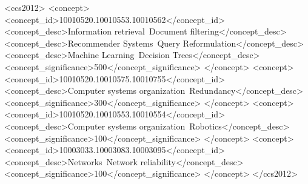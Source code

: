 \documentclass{sig-alternate-05-2015}
\begin{document}
%
%
\begin{CCSXML}
<ccs2012>
 <concept>
  <concept_id>10010520.10010553.10010562</concept_id>
  <concept_desc>Information retrieval~Document filtering</concept_desc>
  <concept_desc>Recommender Systems~Query Reformulation</concept_desc>
  <concept_desc>Machine Learning~Decision Trees</concept_desc>
  <concept_significance>500</concept_significance>
 </concept>
 <concept>
  <concept_id>10010520.10010575.10010755</concept_id>
  <concept_desc>Computer systems organization~Redundancy</concept_desc>
  <concept_significance>300</concept_significance>
 </concept>
 <concept>
  <concept_id>10010520.10010553.10010554</concept_id>
  <concept_desc>Computer systems organization~Robotics</concept_desc>
  <concept_significance>100</concept_significance>
 </concept>
 <concept>
  <concept_id>10003033.10003083.10003095</concept_id>
  <concept_desc>Networks~Network reliability</concept_desc>
  <concept_significance>100</concept_significance>
 </concept>
</ccs2012>  
\end{CCSXML}



%
%

%
%
\printccsdesc






\end{document}
